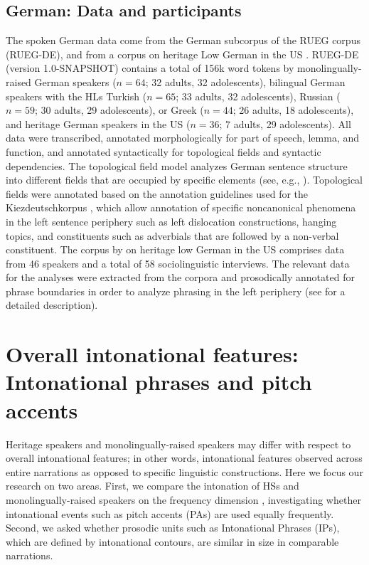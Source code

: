 \documentclass[output=paper,colorlinks,citecolor=brown]{langscibook}
\begin{document}
\subsection{German: Data and participants} \label{chapter12:section 2.2}

The spoken German data come from the German subcorpus of the RUEG corpus (RUEG-DE), and from a corpus on heritage Low German in the US \citep{Rocker_2022}. RUEG-DE (version 1.0-SNAPSHOT) contains a total of 156k word tokens by monolingually-raised German speakers ($n=64$; 32 adults, 32 adolescents), bilingual German speakers with the HLs Turkish ($n=65$; 33 adults, 32 adolescents), Russian ($n=59$; 30 adults, 29 adolescents), or Greek ($n=44$; 26 adults, 18 adolescents), and heritage German speakers in the US ($n=36$; 7 adults, 29 adolescents). All data were transcribed, annotated morphologically for part of speech, lemma, and function, and annotated syntactically for topological fields and syntactic dependencies. The topological field model analyzes German sentence structure into different fields that are occupied by specific elements (see, e.g., \cite{Drach_1937, Höhle_1986}). Topological fields were annotated based on the annotation guidelines used for the Kiezdeutschkorpus \citep{Wiese_etal_2010}, which allow annotation of specific noncanonical phenomena in the left sentence periphery such as left dislocation constructions, hanging topics, and constituents such as adverbials that are followed by a non-verbal constituent. The corpus by \citet{Rocker_2022} on heritage low German in the US comprises data from 46 speakers and a total of 58 sociolinguistic interviews. The relevant data for the analyses were extracted from the corpora and prosodically annotated for phrase boundaries in order to analyze phrasing in the left periphery (see  for a detailed description).


\section{Overall intonational features: Intonational phrases and pitch accents} \label{chapter12:section 3}

Heritage speakers and monolingually-raised speakers may differ with respect to overall intonational features; in other words, intonational features observed across entire narrations as opposed to specific linguistic constructions. Here we focus our research on two areas. First, we compare the intonation of HSs and monolingually-raised speakers on the frequency dimension \citep{Mennen_2015}, investigating whether intonational events such as pitch accents (PAs) are used equally frequently. Second, we asked whether prosodic units such as Intonational Phrases (IPs), which are defined by intonational contours, are similar in size in comparable narrations.
\end{document}
